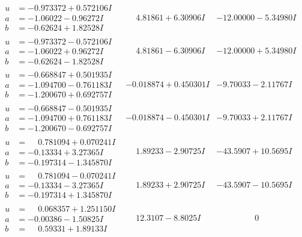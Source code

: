 \documentclass[1p]{elsarticle_modified}
\theoremstyle{definition}
\begin{document}
$$\begin{array}{c|c|c}
\begin{aligned}
u &= -0.973372 + 0.572106 I \\
a &= -1.06022 - 0.96272 I \\
b &= -0.62624 + 1.82528 I\end{aligned}
 & \phantom{-}4.81861 + 6.30906 I & -12.00000 - 5.34980 I \\ \hline\begin{aligned}
u &= -0.973372 - 0.572106 I \\
a &= -1.06022 + 0.96272 I \\
b &= -0.62624 - 1.82528 I\end{aligned}
 & \phantom{-}4.81861 - 6.30906 I & -12.00000 + 5.34980 I \\ \hline\begin{aligned}
u &= -0.668847 + 0.501935 I \\
a &= -1.094700 - 0.761183 I \\
b &= -1.200670 + 0.692757 I\end{aligned}
 & -0.018874 + 0.450301 I & -9.70033 - 2.11767 I \\ \hline\begin{aligned}
u &= -0.668847 - 0.501935 I \\
a &= -1.094700 + 0.761183 I \\
b &= -1.200670 - 0.692757 I\end{aligned}
 & -0.018874 - 0.450301 I & -9.70033 + 2.11767 I \\ \hline\begin{aligned}
u &= \phantom{-}0.781094 + 0.070241 I \\
a &= -0.13334 + 3.27365 I \\
b &= -0.197314 - 1.345870 I\end{aligned}
 & \phantom{-}1.89233 - 2.90725 I & -43.5907 + 10.5695 I \\ \hline\begin{aligned}
u &= \phantom{-}0.781094 - 0.070241 I \\
a &= -0.13334 - 3.27365 I \\
b &= -0.197314 + 1.345870 I\end{aligned}
 & \phantom{-}1.89233 + 2.90725 I & -43.5907 - 10.5695 I \\ \hline\begin{aligned}
u &= \phantom{-}0.068357 + 1.251150 I \\
a &= -0.00386 - 1.50825 I \\
b &= \phantom{-}0.59331 + 1.89133 I\end{aligned}
 & \phantom{-}12.3107 - 8.8025 I & \phantom{-0.000000 } 0 \\ \hline\begin{aligned}

\end{aligned}
\end{array}$$
\end{document}
